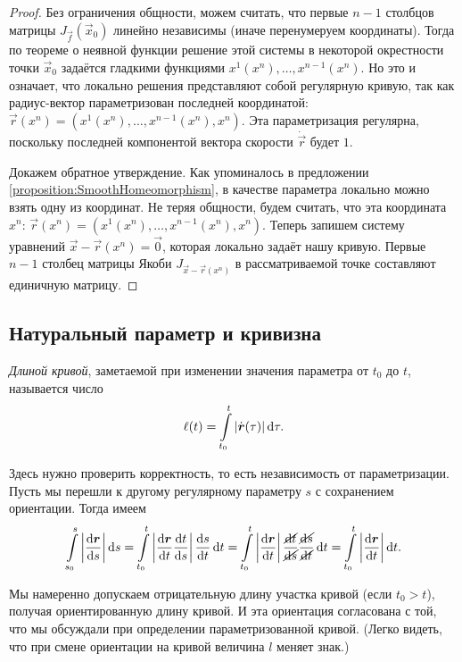 \begin{proof}
	Без ограничения общности, можем считать, что первые $n - 1$ столбцов матрицы $J_{\vec{f}}(\vec{x}_0)$ линейно независимы (иначе перенумеруем координаты). Тогда по теореме о неявной функции решение этой системы в некоторой окрестности точки $\vec{x}_0$ задаётся гладкими функциями $x^1(x^n), \ldots, x^{n - 1}(x^n)$. Но это и означает, что локально решения представляют собой регулярную кривую, так как радиус-вектор параметризован последней координатой: $\vec{r}(x^n) = (x^1(x^n), \ldots, x^{n - 1}(x^n), x^n)$. Эта параметризация регулярна, поскольку последней компонентой вектора скорости $\dot{\vec{r}}$ будет $1$.

	Докажем обратное утверждение. Как упоминалось в предложении \ref{proposition:SmoothHomeomorphism}, в качестве параметра локально можно взять одну из координат. Не теряя общности, будем считать, что эта координата $x^n$: $\vec{r}(x^n) = (x^1(x^n), \ldots, x^{n - 1}(x^n), x^n)$. Теперь запишем систему уравнений $\vec{x} - \vec{r}(x^n) = \vec{0}$, которая локально задаёт нашу кривую. Первые $n - 1$ столбец матрицы Якоби $J_{\vec{x} - \vec{r}(x^n)}$ в рассматриваемой точке составляют единичную матрицу.
\end{proof}

\subsection{Натуральный параметр и кривизна}

\begin{definition}
	\textit{Длиной кривой}, заметаемой при изменении значения параметра от $t_0$ до $t$, называется число
	\[
		\ell(t) = \int\limits_{t_0}^t\left\lvert\dot{\boldsymbol{r}}(\tau)\right\rvert\mathop{}\!\mathrm{d}\tau.
	\]
\end{definition}

Здесь нужно проверить корректность, то есть независимость от параметризации. Пусть мы перешли к другому регулярному параметру $s$ с сохранением ориентации. Тогда имеем
\[
	\int\limits_{s_0}^s\abs{\frac{\d\vec{r}}{\d s}}\d s = \int\limits_{t_0}^t\abs{\frac{\d\vec{r}}{\d t}\frac{\d t}{\d s}}\frac{\d s}{\d t}\d t = \int\limits_{t_0}^t\abs{\frac{\d\vec{r}}{\d t}}\frac{\cancel{\d t}}{\cancel{\d s}}\frac{\cancel{\d s}}{\cancel{\d t}}\d t = \int\limits_{t_0}^t\abs{\frac{\d\vec{r}}{\d t}}\d t.
\]

Мы намеренно допускаем отрицательную длину участка кривой (если $t_0 > t$), получая ориентированную длину кривой. И эта ориентация согласована с той, что мы обсуждали при определении параметризованной кривой. (Легко видеть, что при смене ориентации на кривой величина $l$ меняет знак.)

